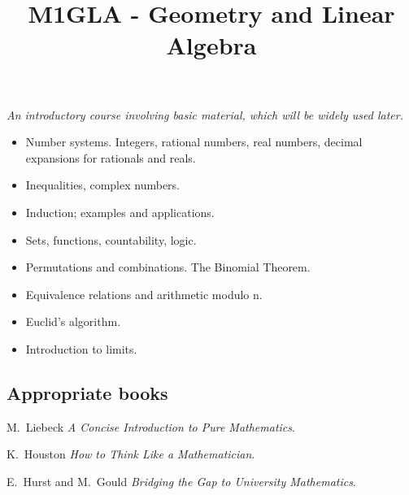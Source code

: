 \documentclass[twoside]{scrartcl}
\title{M1GLA - Geometry and Linear Algebra}
\begin{document}
{
{\Large\bfseries{}}

\textit{An introductory course involving basic material, which will be widely used later.}

\begin{itemize}
\item Number systems. Integers, rational numbers, real numbers, decimal expansions for rationals and
reals. 
\item Inequalities, complex numbers.
\item Induction; examples and applications.
\item  Sets, functions, countability, logic.
\item Permutations and combinations. The Binomial Theorem.
\item Equivalence relations and arithmetic modulo n.
\item Euclid’s algorithm.
\item Introduction to limits.
\end{itemize}

\subsection*{Appropriate books}

{\shortskip
M.~Liebeck \emph{A Concise Introduction to Pure Mathematics}.

K.~Houston \emph{How to Think Like a Mathematician}. 

E.~Hurst and M.~Gould \emph{Bridging the Gap to University Mathematics}. 
}}

\TableofContents

\end{document}
